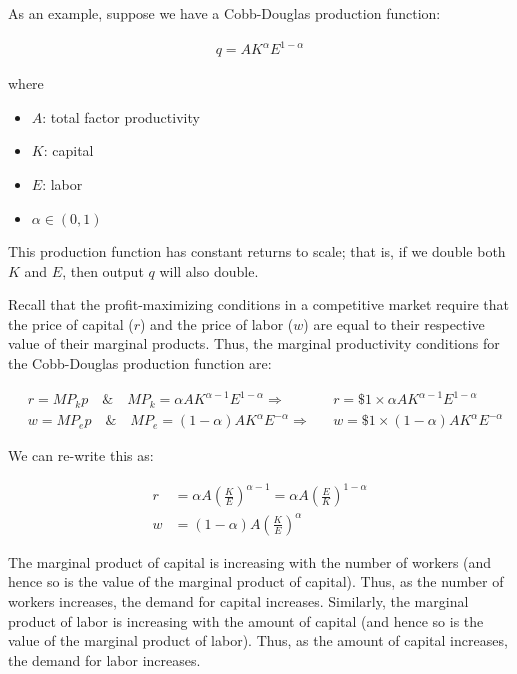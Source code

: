 As an example, suppose we have a Cobb-Douglas production function:

\begin{align}
    q=A K^\alpha E^{1-\alpha}
\end{align}

where

\begin{itemize}
    \item $A$: total factor productivity
    \item $K$: capital
    \item $E$: labor
    \item $\alpha \in (0,1)$
\end{itemize}

This production function has constant returns to scale;
that is, if we double both $K$ and $E$, then output $q$ will also double.

Recall that the profit-maximizing conditions in 
a competitive market require that 
the price of capital ($r$) and the price of labor ($w$)
are equal to their respective value of their marginal products.
Thus, the marginal productivity conditions for 
the Cobb-Douglas production function are: 

\begin{align}
    &r=M P_k p \quad \& \quad M P_k=\alpha A K^{\alpha-1} E^{1-\alpha}
    \Rightarrow &&r=\$ 1 \times \alpha A K^{\alpha-1} E^{1-\alpha} \\
    &w=M P_e p \quad \& \quad M P_e=(1-\alpha) A K^{\alpha} E^{-\alpha}
    \Rightarrow &&w=\$ 1 \times (1-\alpha) A K^{\alpha} E^{-\alpha}
\end{align}

We can re-write this as:

\begin{align}
    r & =\alpha A\left(\frac{K}{E}\right)^{\alpha-1}=\alpha A\left(\frac{E}{K}\right)^{1-\alpha} \label{eq:ch4_rental_cobb_douglas} \\
    w & =(1-\alpha) A\left(\frac{K}{E}\right)^\alpha
\end{align}

The marginal product of capital is increasing with the number of 
workers (and hence so is the value of the marginal product of capital).
Thus, as the number of workers increases, the demand for capital increases.
Similarly, the marginal product of labor is increasing with the amount of
capital (and hence so is the value of the marginal product of labor).
Thus, as the amount of capital increases, the demand for labor increases.

